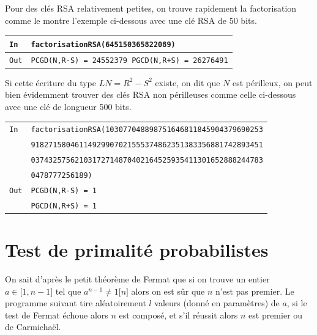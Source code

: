 \documentclass[titlepage]{article}
\begin{document}
    

    Pour des clés RSA relativement petites, on trouve rapidement la factorisation comme le montre l'exemple ci-dessous avec une clé RSA de 50 bits. \bigbreak

    \begin{tabularx}{12cm}{|p{0.60cm}|X|}
        \hline
        \rowcolor{gray}
        \texttt{In}
        & 
        \texttt{factorisationRSA(645150365822089)}
        \\
        \hline
        \texttt{Out}
        &
        \texttt{PCGD(N,R-S) =  24552379 \newline
        PGCD(N,R+S) =  26276491}
        \\
        \hline
    \end{tabularx}
    \bigbreak
    
    Si cette écriture du type $LN = R^2 - S^2$ existe, on dit que $N$ est périlleux, on peut bien évidemment trouver des clés RSA non périlleuses comme celle ci-dessous avec une clé de longueur 500 bits.\bigbreak
    
    \begin{tabularx}{12cm}{|p{0.60cm}|X|}
        \hline
        \rowcolor{gray} \texttt{In} & \texttt{factorisationRSA(103077048898751646811845904379690253} \\
        \rowcolor{gray} & \texttt{91827158046114929907021555374862351383356881742893451} \\
        \rowcolor{gray} & \texttt{03743257562103172714870402164525935411301652888244783} \\
        \rowcolor{gray} & \texttt{0478777256189)} \\
        \hline
        \texttt{Out} & \texttt{PCGD(N,R-S) =  1} \\
        & \texttt{PGCD(N,R+S) =  1} \\
        \hline
    \end{tabularx}
    \bigbreak
    

    \section{Test de primalité probabilistes}
    On sait d'après le petit théorème de Fermat que si on trouve un entier $a \in \lbrack1,n-1\rbrack$
    tel que $a^{n-1} \neq 1 \lbrack n \rbrack$ alors on est sûr que $n$ n'est pas premier. 
    Le programme suivant tire aléatoirement $l$ valeurs (donné en paramètres) de $a$, 
    si le test de Fermat échoue alors $n$ est composé, et s'il réussit alors $n$ est premier ou de Carmichaël.
\end{document}
